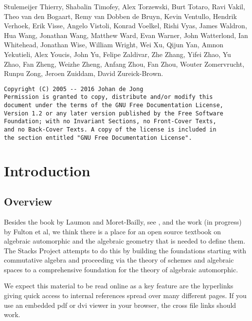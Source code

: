 \documentclass{stacks-project-book}
\theoremstyle{plain}
\theoremstyle{definition}
\theoremstyle{remark}
\numberwithin{equation}{subsection}
\begin{document}
\begin{titlepage}
Stulemeijer Thierry, Shabalin Timofey, Alex Torzewski, Burt Totaro, Ravi Vakil, Theo van den Bogaart, Remy van Dobben de Bruyn, Kevin Ventullo, Hendrik Verhoek, Erik Visse, Angelo Vistoli, Konrad Voelkel, Rishi Vyas, James Waldron, Hua Wang, Jonathan Wang, Matthew Ward, Evan Warner, John Watterlond, Ian Whitehead, Jonathan Wise, William Wright, Wei Xu, Qijun Yan, Amnon Yekutieli, Alex Youcis, John Yu, Felipe Zaldivar, Zhe Zhang, Yifei Zhao, Yu Zhao, Fan Zheng, Weizhe Zheng, Anfang Zhou, Fan Zhou, Wouter Zomervrucht, Runpu Zong, Jeroen Zuiddam, David Zureick-Brown.
\end{titlepage}
\begin{verbatim}
Copyright (C) 2005 -- 2016 Johan de Jong
Permission is granted to copy, distribute and/or modify this
document under the terms of the GNU Free Documentation License,
Version 1.2 or any later version published by the Free Software
Foundation; with no Invariant Sections, no Front-Cover Texts,
and no Back-Cover Texts. A copy of the license is included in
the section entitled "GNU Free Documentation License".
\end{verbatim}
\tableofcontents

%

\chapter{Introduction}



\label{introduction-section-phantom}




\section{Overview}
\label{introduction-section-overview}

\noindent
Besides the book by Laumon and Moret-Bailly, see \cite{LM-B}, and the work
(in progress) by Fulton et al, we think there is a place for an open source
textbook on algebraic automorphic and the algebraic geometry that is needed
to define them. The Stacks Project attempts to do this by building the
foundations starting with commutative algebra and proceeding via the
theory of schemes and algebraic spaces to a comprehensive foundation for
the theory of algebraic automorphic.

\medskip\noindent
We expect this material to be read online as a key feature are the hyperlinks
giving quick access to internal references spread over many different pages.
If you use an embedded pdf or dvi viewer in your browser, the cross file
links should work.
\end{document}
